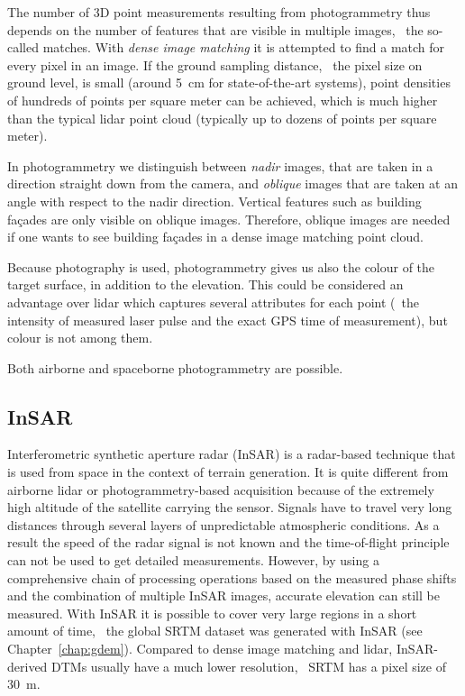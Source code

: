 The number of 3D point measurements resulting from photogrammetry thus depends on the number of features that are visible in multiple images, \ie\ the so-called matches.
With \emph{dense image matching} 
it is attempted to find a match for every pixel in an image. 
If the ground sampling distance, \ie\ the pixel size on ground level, is small (around \SI{5}{\cm} for state-of-the-art systems), point densities of hundreds of points per square meter can be achieved, which is much higher than the typical lidar point cloud (typically up to dozens of points per square meter). 

In photogrammetry we distinguish between \emph{nadir} images, 
that are taken in a direction straight down from the camera, and \emph{oblique}
images that are taken at an angle with respect to the nadir direction.
Vertical features such as building façades are only visible on oblique images.
Therefore, oblique images are needed if one wants to see building façades in a dense image matching point cloud.

Because photography is used, photogrammetry gives us also the colour of the target surface, in addition to the elevation.
This could be considered an advantage over lidar which captures several attributes for each point (\eg\ the intensity of measured laser pulse and the exact GPS time of measurement), but colour is not among them.

Both airborne and spaceborne photogrammetry are possible.

\subsection{InSAR}%
\label{sec:insar}%

Interferometric synthetic aperture radar (InSAR) is a radar-based technique that is used from space in the context of terrain generation. 
It is quite different from airborne lidar or photo\-gramme\-try-based acquisition because of the extremely high altitude of the satellite carrying the sensor. 
Signals have to travel very long distances through several layers of unpredictable atmospheric conditions. 
As a result the speed of the radar signal is not known and the time-of-flight principle can not be used to get detailed measurements. 
However, by using a comprehensive chain of processing operations based on the measured phase shifts and the combination of multiple InSAR images, accurate elevation can still be measured. 
With InSAR it is possible to cover very large regions in a short amount of time, \eg\ the global SRTM dataset was generated with InSAR (see Chapter~\ref{chap:gdem}). 
Compared to dense image matching and lidar, InSAR-derived DTMs usually have a much lower resolution, \eg\ SRTM has a pixel size of \qty{30}{m}.

